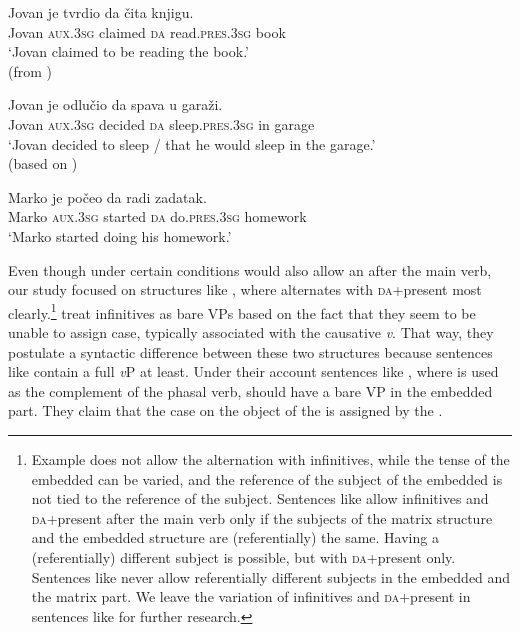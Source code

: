 \documentclass[output=paper,modfonts,newtxmath,hidelinks,]{langscibook}
\begin{document}
\ea \label{7:ex8}
\gll { }Jovan je tvrdio da čita knjigu.\\
     { }Jovan \textsc{aux.3sg} claimed \textsc{da} read.\textsc{pres.3sg} book\\
\glt { }`Jovan claimed to be reading the book.'\\\hfill (from \citealt{TodorovicWurmbrand2015})
\z

\ea \label{7:ex9}
\gll { }Jovan je odlučio da spava u garaži.\\
     { }Jovan \textsc{aux.3sg} decided \textsc{da} sleep.\textsc{pres.3sg} in garage\\
\glt { }`Jovan decided to sleep / that he would sleep in the garage.'\\
\hfill (based on \citealt{TodorovicWurmbrand2015})
\z

\ea \label{7:ex10}
\gll { }Marko je počeo da radi zadatak.\\
     { }Marko \textsc{aux.3sg} started \textsc{da} do.\textsc{pres.3sg} homework\\
\glt { }`Marko started doing his homework.'
\z

\noindent Even though under certain conditions  would also allow an  after the main verb, our study focused on structures like , where  alternates with 
\textsc{da}+present most clearly.\footnote{\label{7:fn3}Example  does not allow the alternation with infinitives, while the tense of the embedded  can be varied, and the reference of the subject of the embedded  is not tied to the reference of the  subject. Sentences like  allow infinitives and \textsc{da}+present after the main verb only if the subjects of the matrix structure and the embedded structure are (referentially) the same. Having a (referentially) different subject is possible, but with \textsc{da}+present only. Sentences like  never allow referentially different subjects in the embedded and the matrix part. We leave the variation of infinitives and \textsc{da}+present in sentences like  for further research.} \citet{TodorovicWurmbrand2015} treat infinitives as bare VPs based on the fact that they seem to be unable to assign  case, typically associated with the causative \textit{v}. That way, they postulate a syntactic difference between these two structures because sentences like  contain a full \textit{v}P at least. Under their account sentences like , where  is used as the complement of the phasal verb, should have a bare VP in the embedded part. They claim that the  case on the object of the  is assigned by the . 
\end{document}
